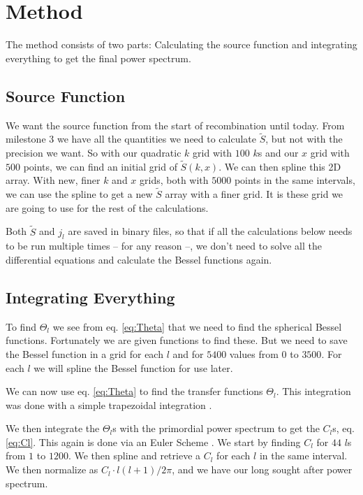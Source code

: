 \documentclass[a4paper,norsk, 10pt]{article}
\begin{document}

\section{Method}
The method consists of two parts: Calculating the source function and integrating everything to get the final power spectrum.

\subsection{Source Function}
We want the source function from the start of recombination until today. From milestone 3 we have all the quantities we need to calculate $\tilde{S}$, but not with the precision we want. So with our quadratic $k$ grid with $100$ $k$s and our $x$ grid with $500$ points, we can find an initial grid of $\tilde{S}(k,x)$. We can then spline this 2D array. With new, finer $k$ and $x$ grids, both with $5000$ points in the same intervals, we can use the spline to get a new $\tilde{S}$ array with a finer grid. It is these grid we are going to use for the rest of the calculations.

Both $\tilde{S}$ and $j_l$ are saved in binary files, so that if all the calculations below needs to be run multiple times -- for any reason --, we don't need to solve all the differential equations and calculate the Bessel functions again.

\subsection{Integrating Everything}
To find $\Theta_l$ we see from eq. \eqref{eq:Theta} that we need to find the spherical Bessel functions. Fortunately we are given functions to find these. But we need to save the Bessel function in a grid for each $l$ and for $5400$ values from $0$ to $3500$. For each $l$ we will spline the Bessel function for use later.

We can now use eq. \eqref{eq:Theta} to find the transfer functions $\Theta_l$. This integration was done with a simple trapezoidal integration . 

We then integrate the $\Theta_l$s with the primordial power spectrum to get the $C_l$s, eq. \eqref{eq:Cl}. This again is done via an Euler Scheme . We start by finding $C_l$ for $44$ $l$s from $1$ to $1200$. We then spline and retrieve a $C_l$ for each $l$ in the same interval. We then normalize as $C_l\cdot l(l+1)/2\pi$, and we have our long sought after power spectrum. 
\end{document}
